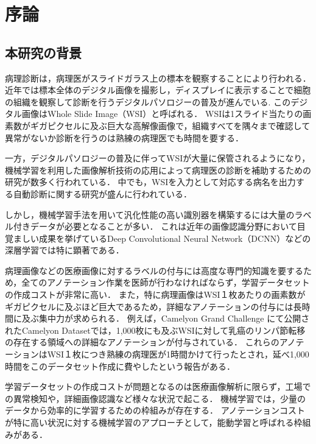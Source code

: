 \chapter{序論}

\section{本研究の背景}

病理診断は，病理医がスライドガラス上の標本を観察することにより行われる．
近年では標本全体のデジタル画像を撮影し，ディスプレイに表示することで細胞の組織を観察して診断を行うデジタルパソロジーの普及が進んでいる\cite{pantanowitz2010digital}.
このデジタル画像はWhole Slide Image（WSI）と呼ばれる．
WSIは1スライド当たりの画素数がギガピクセルに及ぶ巨大な高解像画像で，組織すべてを隅々まで確認して異常がないか診断を行うのは熟練の病理医でも時間を要する．

一方，デジタルパソロジーの普及に伴ってWSIが大量に保管されるようになり，機械学習を利用した画像解析技術の応用によって病理医の診断を補助するための研究が数多く行われている\cite{gurcan2009histopathological, komuraishikawa, litjens2017survey}．
中でも，WSIを入力として対応する病名を出力する自動診断に関する研究が盛んに行われている\cite{doyle2008automated,dundar2011computerized}．

しかし，機械学習手法を用いて汎化性能の高い識別器を構築するには大量のラベル付きデータが必要となることが多い．
これは近年の画像認識分野において目覚ましい成果を挙げているDeep Convolutional Neural Network（DCNN）などの深層学習では特に顕著である．

病理画像などの医療画像に対するラベルの付与には高度な専門的知識を要するため，全てのアノテーション作業を医師が行わなければならず，学習データセットの作成コストが非常に高い．
また，特に病理画像はWSI１枚あたりの画素数がギガピクセルに及ぶほど巨大であるため，詳細なアノテーションの付与には長時間に及ぶ集中力が求められる．
例えば，Camelyon Grand Challenge \cite{Camelyon17}にて公開されたCamelyon Datasetでは，1,000枚にも及ぶWSIに対して乳癌のリンパ節転移の存在する領域への詳細なアノテーションが付与されている．
これらのアノテーションはWSI１枚につき熟練の病理医が1時間かけて行ったとされ，延べ1,000時間をこのデータセット作成に費やしたという報告がある．

学習データセットの作成コストが問題となるのは医療画像解析に限らず，工場での異常検知や，詳細画像認識など様々な状況で起こる．
機械学習では，少量のデータから効率的に学習するための枠組みが存在する．
アノテーションコストが特に高い状況に対する機械学習のアプローチとして，能動学習\cite{settles2010active}と呼ばれる枠組みがある．

